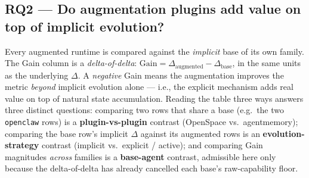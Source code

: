 \documentclass{article}
\begin{document}
\subsection{RQ2 --- Do augmentation plugins add value on top of implicit evolution?}
\label{sec:rq2}
Every augmented runtime is compared against the \emph{implicit} base of its own family. The Gain column is a \emph{delta-of-delta}: $\text{Gain} = \Delta_\text{augmented} - \Delta_\text{base}$, in the same units as the underlying $\Delta$. A \emph{negative} Gain means the augmentation improves the metric \emph{beyond} implicit evolution alone --- i.e., the explicit mechanism adds real value on top of natural state accumulation. Reading the table three ways answers three distinct questions: comparing two rows that share a base (e.g.\ the two \texttt{openclaw} rows) is a \textbf{plugin-vs-plugin} contrast (OpenSpace vs.\ agentmemory); comparing the base row's implicit $\Delta$ against its augmented rows is an \textbf{evolution-strategy} contrast (implicit vs.\ explicit / active); and comparing Gain magnitudes \emph{across} families is a \textbf{base-agent} contrast, admissible here only because the delta-of-delta has already cancelled each base's raw-capability floor.
\end{document}
